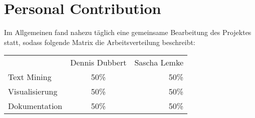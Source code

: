 \section{Personal Contribution}
Im Allgemeinen fand nahezu t\"aglich eine gemeinsame Bearbeitung des Projektes statt, sodass folgende Matrix die Arbeitsverteilung beschreibt:
\begin{tabular}{ l c r }
  & Dennis Dubbert & Sascha Lemke \\
  Text Mining & 50\% & 50\% \\
  Visualisierung & 50\% & 50\% \\
  Dokumentation & 50\% & 50\% \\
\end{tabular}
